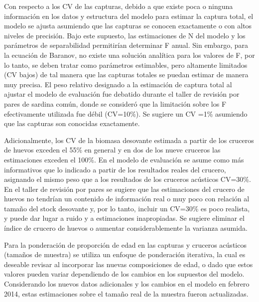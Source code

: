 \documentclass[
  spanish,
]{article}
\begin{document}
Con respecto a los CV de las capturas, debido a que existe poca o
ninguna información en los datos y estructura del modelo para estimar la
captura total, el modelo se ajusta asumiendo que las capturas se conocen
exactamente o con altos niveles de precisión. Bajo este supuesto, las
estimaciones de N del modelo y los parámetros de separabilidad
permitirían determinar F anual. Sin embargo, para la ecuación de
Baranov, no existe una solución analítica para los valores de F, por lo
tanto, se deben tratar como parámetros estimables, pero altamente
limitados (CV bajos) de tal manera que las capturas totales se puedan
estimar de manera muy precisa. El peso relativo designado a la
estimación de captura total al ajustar el modelo de evaluación fue
debatido durante el taller de revisión por pares de sardina común, donde
se consideró que la limitación sobre los F efectivamente utilizada fue
débil (CV=10\%). Se sugiere un CV =1\% asumiendo que las capturas son
conocidas exactamente.

Adicionalmente, los CV de la biomasa desovante estimada a partir de los
cruceros de huevos exceden el 55\% en general y en dos de los nueve
cruceros las estimaciones exceden el 100\%. En el modelo de evaluación
se asume como más informativos que lo indicado a partir de los
resultados reales del crucero, asignando el mismo peso que a los
resultados de los cruceros acústicos CV=30\%. En el taller de revisión
por pares se sugiere que las estimaciones del crucero de huevos no
tendrían un contenido de información real o muy poco con relación al
tamaño del stock desovante y, por lo tanto, incluir un CV=30\% es poco
realista, y puede dar lugar a ruido y a estimaciones inapropiadas. Se
sugiere eliminar el índice de crucero de huevos o aumentar
considerablemente la varianza asumida.

Para la ponderación de proporción de edad en las capturas y cruceros
acústicos (tamaños de muestra) se utiliza un enfoque de ponderación
iterativa, la cual es deseable revisar al incorporar las nuevas
composiciones de edad, o dado que estos valores pueden variar
dependiendo de los cambios en los supuestos del modelo. Considerando los
nuevos datos adicionales y los cambios en el modelo en febrero 2014,
estas estimaciones sobre el tamaño real de la muestra fueron
actualizadas.
\end{document}
